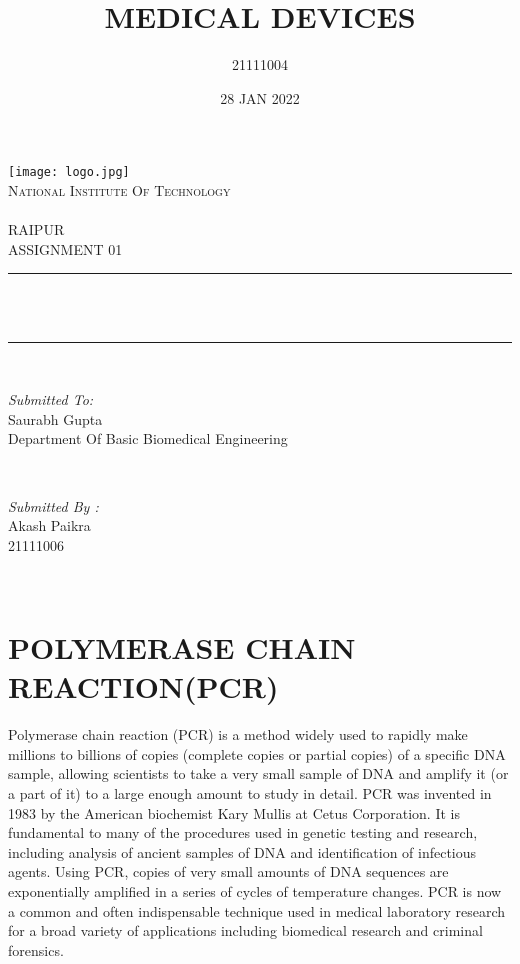 \documentclass[12pt]{article}
\title{MEDICAL DEVICES}
\author{21111004}
\date{28 JAN 2022}
\makeatletter
\let\thetitle\@title
\makeatother
\begin{document}
\begin{titlepage}
	\centering
    \texttt{[image: logo.jpg]}\\[1.0 cm]	
    \textsc{\LARGE National Institute Of Technology \newline\\\\ RAIPUR}\\[2.0 CM]
    
	\textsc{\Large ASSIGNMENT 01}\\[0.5 cm]				%
	\rule{\linewidth}{0.4 mm} \\[0.4 cm]
	{ \huge \bfseries \thetitle}\\
	\rule{\linewidth}{0.4 mm} \\[1.5 cm]
	
	\begin{minipage}{0.6\textwidth}
		\begin{flushleft} \large
			\emph{Submitted To:}\\
			Saurabh Gupta\\
            Department Of Basic Biomedical Engineering\\
			\end{flushleft}
			\end{minipage}~
			\begin{minipage}{0.4\textwidth}
            
			\begin{flushright} \large
			\emph{Submitted By :}\\
			Akash Paikra\\
            21111006\\
		\end{flushright}
        
	\end{minipage}\\[2 cm]
\end{titlepage}

\tableofcontents
\pagebreak







\section{POLYMERASE CHAIN REACTION(PCR)}
Polymerase chain reaction (PCR) is a method widely used to rapidly make millions to billions of copies (complete copies or partial copies) of a specific DNA sample, allowing scientists to take a very small sample of DNA and amplify it (or a part of it) to a large enough amount to study in detail. PCR was invented in 1983 by the American biochemist Kary Mullis at Cetus Corporation. It is fundamental to many of the procedures used in genetic testing and research, including analysis of ancient samples of DNA and identification of infectious agents. Using PCR, copies of very small amounts of DNA sequences are exponentially amplified in a series of cycles of temperature changes. PCR is now a common and often indispensable technique used in medical laboratory research for a broad variety of applications including biomedical research and criminal forensics.
\end{document}
